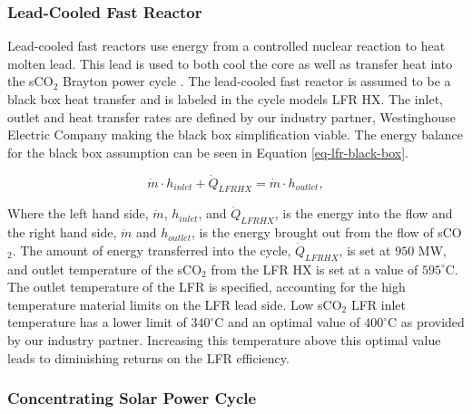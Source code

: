 \begin{paracol}{2}
\subsubsection{Lead-Cooled Fast Reactor}
Lead-cooled fast reactors use energy from a controlled nuclear reaction to heat molten lead. This lead is used to both cool the core as well as transfer heat into the sCO$_2$ Brayton power cycle \cite{smith_2016_lfr_background,alemberti_2013_lfr_overview}. The lead-cooled fast reactor is assumed to be a black box heat transfer and is labeled in the cycle models LFR HX. The inlet, outlet and heat transfer rates are defined by our industry partner, Westinghouse Electric Company making the black box simplification viable. The energy balance for the black box assumption can be seen in Equation \ref{eq-lfr-black-box}.

\begin{equation}
    \label{eq-lfr-black-box}
    \dot{m} \cdot h_{inlet} + \dot{Q}_{LFRHX} = \dot{m} \cdot h_{outlet},
\end{equation}


Where the left hand side, $\dot{m}$, $h_{inlet}$, and $\dot{Q}_{LFRHX}$, is the energy into the flow and the right hand side, $\dot{m}$ and $h_{outlet}$, is the energy brought out from the flow of sCO$_2$. The amount of energy transferred into the cycle, $\dot{Q}_{LFRHX}$, is set at $950$ MW, and outlet temperature of the sCO$_2$ from the LFR HX is set at a value of $595^{\circ}$C. 
The outlet temperature of the LFR is specified, accounting for the high temperature material limits on the LFR lead side. Low sCO$_2$ LFR inlet temperature has a lower limit of $340^{\circ}$C and an optimal value of $400^{\circ}$C as provided by our industry partner.
Increasing this temperature above this optimal value leads to diminishing returns on the LFR efficiency.


\subsubsection{Concentrating Solar Power Cycle}


\end{paracol}
